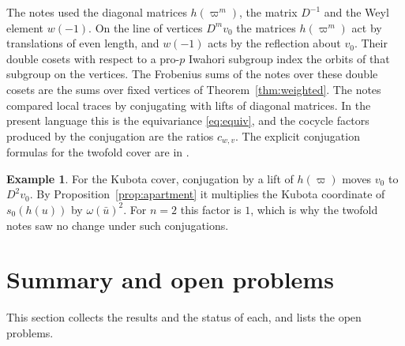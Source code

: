 \documentclass[12pt,letterpaper]{article}
\numberwithin{equation}{section}
\theoremstyle{definition}
\newtheorem{example}[theorem]{Example}
\theoremstyle{remark}
\begin{document}
The notes used the diagonal matrices $h(\varpi^m)$, the matrix $D^{-1}$ and the Weyl element $w(-1)$. On the line of vertices $D^mv_0$ the matrices $h(\varpi^m)$ act by translations of even length, and $w(-1)$ acts by the reflection about $v_0$. Their double cosets with respect to a pro-$p$ Iwahori subgroup index the orbits of that subgroup on the vertices. The Frobenius sums of the notes over these double cosets are the sums over fixed vertices of Theorem~\ref{thm:weighted}. The notes compared local traces by conjugating with lifts of diagonal matrices. In the present language this is the equivariance \eqref{eq:equiv}, and the cocycle factors produced by the conjugation are the ratios $c_{w,v}$. The explicit conjugation formulas for the twofold cover are in \cite{Jo26b}.

\begin{example}
For the Kubota cover, conjugation by a lift of $h(\varpi)$ moves $v_0$ to $D^2v_0$. By Proposition~\ref{prop:apartment} it multiplies the Kubota coordinate of $s_0(h(u))$ by $\omega(\bar u)^2$. For $n=2$ this factor is $1$, which is why the twofold notes saw no change under such conjugations.
\end{example}

\section{Summary and open problems}\label{sec:summary}
This section collects the results and the status of each, and lists the open problems.
\end{document}
